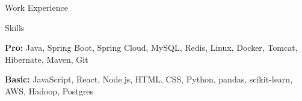 \documentclass{resume} %
\begin{document}
\begin{rSection}{Work Experience}
\end{rSection}

\begin{skillSection}{Skills}
\item {\bf Pro:} Java, Spring Boot, Spring Cloud, MySQL, Redis, Linux, Docker, Tomcat, Hibernate, Maven, Git
\item {\bf Basic:} JavaScript, React, Node.js, HTML, CSS, Python, pandas, scikit-learn, AWS, Hadoop, Postgres
\end{skillSection}
\end{document}
